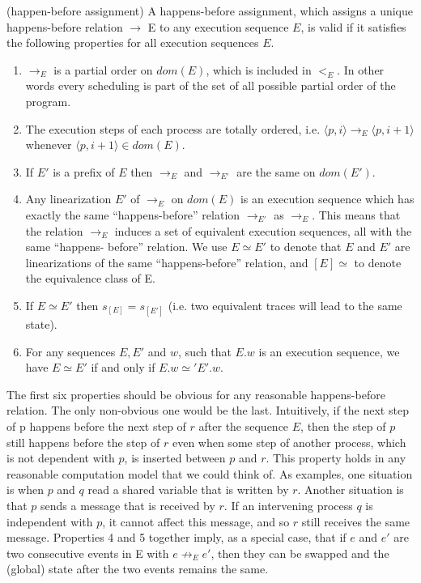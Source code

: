 \begin{definition}{(happen-before assignment)}
    A happens-before assignment, which assigns a
    unique happens-before relation $\rightarrow$ E to any execution sequence
    $E$, is valid if it satisfies the following properties for all execution
    sequences $E$.
    \begin{enumerate}
        \item $\rightarrow_{E}$ is a partial order on $dom(E)$, which is included in $<_E$. In other words every scheduling is part of the set of all possible
        partial order of the program.
        \item The execution steps of each process are totally ordered, i.e. 
        $\langle p,i \rangle \rightarrow_E \langle p,i+1 \rangle$ whenever $\langle p, i+1 \rangle \in dom(E)$.
        \item If $E'$ is a prefix of $E$ then $\rightarrow_E$ and $\rightarrow_{E'}$ are the same on $dom(E')$.
        \item Any linearization $E'$ of $\rightarrow_E$ on $dom(E)$ is an execution sequence which has exactly the same “happens-before” relation
$\rightarrow_{E'}$ as $\rightarrow_E$. This means that the relation $\rightarrow_E$ induces a set
of equivalent execution sequences, all with the same “happens-
before” relation. We use $E \simeq E'$ to denote that $E$ and $E'$ are
linearizations of the same “happens-before” relation, and $[E] \simeq$ 
to denote the equivalence class of E.
    \item If $E \simeq E'$ then $s_{[E]} = s_{[E']}$ (i.e. two equivalent traces will lead to the same state).
    \item For any sequences $E, E'$ and $w$, such that $E.w$ is an execution
sequence, we have $E \simeq E'$  if and only if $E.w \simeq' E'.w$.
    \end{enumerate}
\end{definition}

The first six properties should be obvious for any reasonable
happens-before relation. The only non-obvious one would be the
last. Intuitively, if the next step of p happens before the next step
of $r$ after the sequence $E$, then the step of $p$ still happens before
the step of $r$ even when some step of another process, which is not
dependent with $p$, is inserted between $p$ and $r$. This property holds
in any reasonable computation model that we could think of. As
examples, one situation is when $p$ and $q$ read a shared variable that
is written by $r$. Another situation is that $p$ sends a message that is
received by $r$. If an intervening process $q$ is independent with $p$, it
cannot affect this message, and so $r$ still receives the same message.
Properties 4 and 5 together imply, as a special case, that if $e$
and $e'$ are two consecutive events in E with $e \not \rightarrow_{E} e'$, then they can
be swapped and the (global) state after the two events remains the
same.

